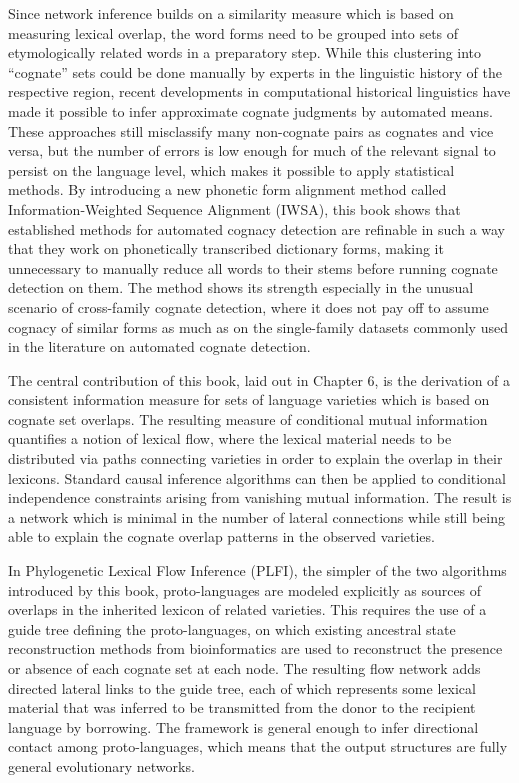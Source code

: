 Since network inference builds on a similarity measure which is based on measuring lexical overlap, the word forms need to be grouped into sets of etymologically related words in a preparatory step. While this clustering into ``cognate'' sets could be done manually by experts in the linguistic history of the respective region, recent developments in computational historical linguistics have made it possible to infer approximate cognate judgments by automated means. These approaches still misclassify many non-cognate pairs as cognates and vice versa, but the number of errors is low enough for much of the relevant signal to persist on the language level, which makes it possible to apply statistical methods. By introducing a new phonetic form alignment method called Information-Weighted Sequence Alignment (IWSA), this book shows that established methods for automated cognacy detection are refinable in such a way that they work on phonetically transcribed dictionary forms, making it unnecessary to manually reduce all words to their stems before running cognate detection on them. The method shows its strength especially in the unusual scenario of cross-family cognate detection, where it does not pay off to assume cognacy of similar forms as much as on the single-family datasets commonly used in the literature on automated cognate detection.

The central contribution of this book, laid out in Chapter 6, is the derivation of a consistent information measure for sets of language varieties which is based on cognate set overlaps. The resulting measure of conditional mutual information quantifies a notion of lexical flow, where the lexical material needs to be distributed via paths connecting varieties in order to explain the overlap in their lexicons. Standard causal inference algorithms can then be applied to conditional independence constraints arising from vanishing mutual information. The result is a network which is minimal in the number of lateral connections while still being able to explain the cognate overlap patterns in the observed varieties.

In Phylogenetic Lexical Flow Inference (PLFI), the simpler of the two algorithms introduced by this book, proto-languages are modeled explicitly as sources of overlaps in the inherited lexicon of related varieties. This requires the use of a guide tree defining the proto-languages, on which existing ancestral state reconstruction methods from bioinformatics are used to reconstruct the presence or absence of each cognate set at each node. The resulting flow network adds directed lateral links to the guide tree, each of which represents some lexical material that was inferred to be transmitted from the donor to the recipient language by borrowing. The framework is general enough to infer directional contact among proto-languages, which means that the output structures are fully general evolutionary networks.

